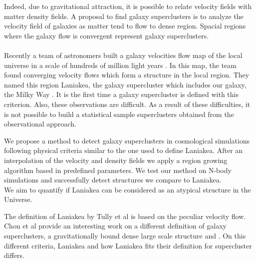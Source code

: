 \documentclass[12pt]{article}
\begin{document}
Indeed, due to gravitational attraction, it is possible
 to relate
  velocity fields with matter density fields. A proposal to
   find galaxy superclusters is to analyze the
    velocity field of galaxies as matter tend to flow
     to
     dense region. Spacial
      regions where the galaxy flow is convergent
       represent galaxy superclusters.\\
\\
Recently a team of astronomers built a galaxy velocities
 flow map
 of the local universe in a scale of hundreds of million
  light
  years \cite{tully_cosmicflows-2_2013}. In this map, the
   team found converging velocity flows which form a
    structure in the local region. They named this region
     Laniakea,
    the galaxy supercluster
     which includes our galaxy, the Milky Way
      \cite{tully_laniakea_2014}. It is the first time a
       galaxy supercluster is defined with this criterion.
        Also, these observations
       are difficult. As a result of these
         difficulties, it is not possible to build a
          statistical sample superclusters obtained
           from the observational approach. 
\\   

\begin{par}
We propose a method to detect galaxy superclusters in
 cosmological simulations following physical criteria
  similar to the one used to define Laniakea. After an
   interpolation of the velocity and density fields we
    apply a region growing algorithm based in predefined
     parameters. We test our method on N-body simulations
      and successfully detect structures we compare to
       Laniakea.\\
We aim to quantify if Laniakea can be
 considered as an atypical structure in
the Universe.   
\\
\end{par}

\begin{par}
The definition of Laniakea by Tully et al
 \cite{tully_laniakea_2014} is based on the
  peculiar velocity flow. Chon et al provide an
   interesting work on a different definition of
    galaxy superclusters, a gravitationally bound
     dense large scale structure
      \cite{chon_characterising_2014} and
       \cite{chon_definition_2015}. On this
        different criteria, Laniakea and how
         Laniakea fits their definition for supercluster
          differs.  \\
\end{par}
\end{document}
